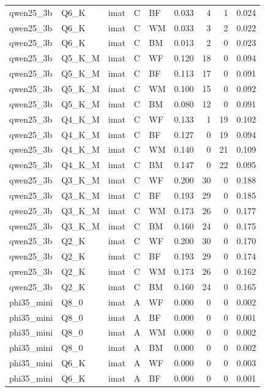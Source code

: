 \begin{tabular}{lllllrrrr}
qwen25\_3b & Q6\_K & imat & C & BF & 0.033 & 4 & 1 & 0.024 \\
qwen25\_3b & Q6\_K & imat & C & WM & 0.033 & 3 & 2 & 0.022 \\
qwen25\_3b & Q6\_K & imat & C & BM & 0.013 & 2 & 0 & 0.023 \\
qwen25\_3b & Q5\_K\_M & imat & C & WF & 0.120 & 18 & 0 & 0.094 \\
qwen25\_3b & Q5\_K\_M & imat & C & BF & 0.113 & 17 & 0 & 0.091 \\
qwen25\_3b & Q5\_K\_M & imat & C & WM & 0.100 & 15 & 0 & 0.092 \\
qwen25\_3b & Q5\_K\_M & imat & C & BM & 0.080 & 12 & 0 & 0.091 \\
qwen25\_3b & Q4\_K\_M & imat & C & WF & 0.133 & 1 & 19 & 0.102 \\
qwen25\_3b & Q4\_K\_M & imat & C & BF & 0.127 & 0 & 19 & 0.094 \\
qwen25\_3b & Q4\_K\_M & imat & C & WM & 0.140 & 0 & 21 & 0.109 \\
qwen25\_3b & Q4\_K\_M & imat & C & BM & 0.147 & 0 & 22 & 0.095 \\
qwen25\_3b & Q3\_K\_M & imat & C & WF & 0.200 & 30 & 0 & 0.188 \\
qwen25\_3b & Q3\_K\_M & imat & C & BF & 0.193 & 29 & 0 & 0.185 \\
qwen25\_3b & Q3\_K\_M & imat & C & WM & 0.173 & 26 & 0 & 0.177 \\
qwen25\_3b & Q3\_K\_M & imat & C & BM & 0.160 & 24 & 0 & 0.175 \\
qwen25\_3b & Q2\_K & imat & C & WF & 0.200 & 30 & 0 & 0.170 \\
qwen25\_3b & Q2\_K & imat & C & BF & 0.193 & 29 & 0 & 0.174 \\
qwen25\_3b & Q2\_K & imat & C & WM & 0.173 & 26 & 0 & 0.162 \\
qwen25\_3b & Q2\_K & imat & C & BM & 0.160 & 24 & 0 & 0.165 \\
phi35\_mini & Q8\_0 & imat & A & WF & 0.000 & 0 & 0 & 0.002 \\
phi35\_mini & Q8\_0 & imat & A & BF & 0.000 & 0 & 0 & 0.001 \\
phi35\_mini & Q8\_0 & imat & A & WM & 0.000 & 0 & 0 & 0.002 \\
phi35\_mini & Q8\_0 & imat & A & BM & 0.000 & 0 & 0 & 0.002 \\
phi35\_mini & Q6\_K & imat & A & WF & 0.000 & 0 & 0 & 0.003 \\
phi35\_mini & Q6\_K & imat & A & BF & 0.000 & 0 & 0 & 0.001 \\

\end{tabular}
